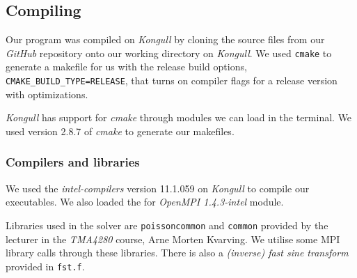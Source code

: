 \subsection{Compiling} %
\label{sub:compiling}
Our program was compiled on \emph{Kongull} by cloning the source files from our \emph{GitHub} repository onto our working directory on \emph{Kongull}. We used \texttt{cmake} to generate a makefile for us with the release build options, \texttt{CMAKE\_BUILD\_TYPE=RELEASE}, that turns on compiler flags for a release version with optimizations.

\emph{Kongull} has support for \emph{cmake} through modules we can load in the terminal. We used version 2.8.7 of \emph{cmake} to generate our makefiles.

\subsubsection{Compilers and libraries} %
\label{ssub:compilers}
We used the \emph{intel-compilers} version 11.1.059 on \emph{Kongull} to compile our executables. We also loaded the for \emph{OpenMPI 1.4.3-intel} module.

Libraries used in the solver are \texttt{poissoncommon} and \texttt{common} provided by the lecturer in the \emph{TMA4280} course, Arne Morten Kvarving. We utilise some MPI library calls through these libraries. There is also a \emph{(inverse) fast sine transform} provided in \texttt{fst.f}.




